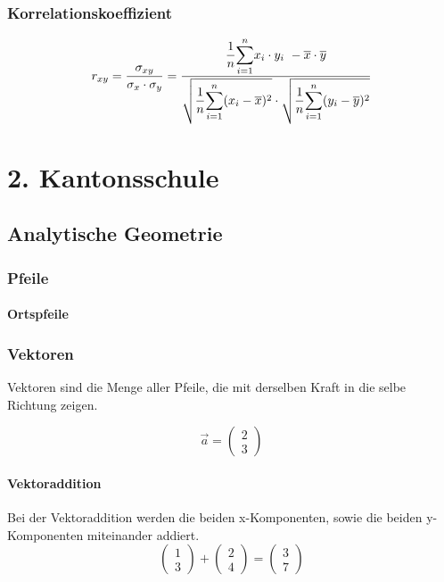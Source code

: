 \documentclass[12pt,a4paper]{scrbook}
\begin{document}
\section{Korrelationskoeffizient}
\[ r_{xy} = \frac{\sigma_{xy}}{\sigma_x \cdot \sigma_y} = \frac{\mathlarger{\frac{1}{n}} \mathlarger{\sum_{i=1}^n} x_i \cdot y_i ~ - \overline{x}\cdot\overline{y}}{\sqrt{\mathlarger{\frac{1}{n}} \mathlarger{\sum_{i=1}^n} (x_i-\overline{x})^2} \cdot \sqrt{\mathlarger{\frac{1}{n}} \mathlarger{\sum_{i=1}^n} (y_i-\overline{y})^2}} \]

\part{2. Kantonsschule}
\chapter{Analytische Geometrie}

\section{Pfeile}
\subsection{Ortspfeile}
\section{Vektoren}
Vektoren sind die Menge aller Pfeile, die mit derselben Kraft in die selbe Richtung zeigen.

\[ \vec{a} = \left(\begin{array}{l}2\\3\end{array}\right) \]

\subsection{Vektoraddition}
Bei der Vektoraddition werden die beiden x-Komponenten, sowie die beiden y-Komponenten miteinander addiert.
\[ \left(\begin{array}{c}1\\3\end{array}\right) + \left(\begin{array}{c}2\\4\end{array}\right) = \left(\begin{array}{c}3\\7\end{array}\right) \]
\end{document}
